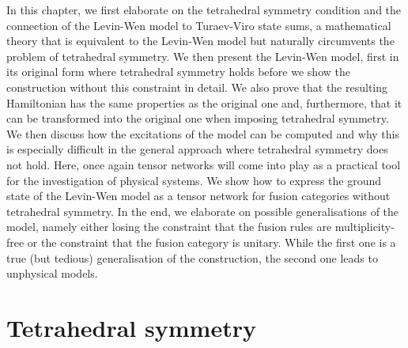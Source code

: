 In this chapter, we first elaborate on the tetrahedral symmetry condition and the connection of the Levin-Wen model to Turaev-Viro state sums, a mathematical theory that is equivalent to the Levin-Wen model but naturally circumvents the problem of tetrahedral symmetry. We then present the Levin-Wen model, first in its original form where tetrahedral symmetry holds before we show the construction without this constraint in detail. We also prove that the resulting Hamiltonian has the same properties as the original one and, furthermore, that it can be transformed into the original one when imposing tetrahedral symmetry. We then discuss how the excitations of the model can be computed and why this is especially difficult in the general approach where tetrahedral symmetry does not hold. Here, once again tensor networks will come into play as a practical tool for the investigation of physical systems. We show how to express the ground state of the Levin-Wen model as a tensor network for fusion categories without tetrahedral symmetry. In the end, we elaborate on possible generalisations of the model, namely either losing the constraint that the fusion rules are multiplicity-free or the constraint that the fusion category is unitary. While the first one is a true (but tedious) generalisation of the construction, the second one leads to unphysical models.

\newpage
\section{Tetrahedral symmetry}
\label{sec:tetrahedral}

